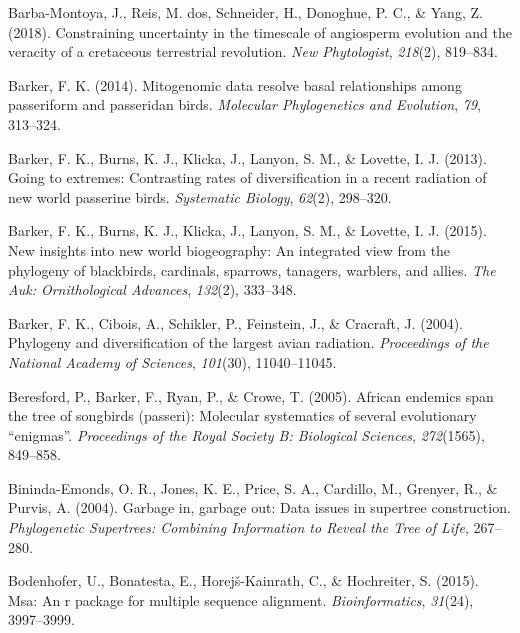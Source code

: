 \documentclass[english,man]{apa6}
\begin{document}
\leavevmode\hypertarget{ref-barba2018constraining}{}%
Barba-Montoya, J., Reis, M. dos, Schneider, H., Donoghue, P. C., \& Yang, Z. (2018). Constraining uncertainty in the timescale of angiosperm evolution and the veracity of a cretaceous terrestrial revolution. \emph{New Phytologist}, \emph{218}(2), 819--834.

\leavevmode\hypertarget{ref-barker2014mitogenomic}{}%
Barker, F. K. (2014). Mitogenomic data resolve basal relationships among passeriform and passeridan birds. \emph{Molecular Phylogenetics and Evolution}, \emph{79}, 313--324.

\leavevmode\hypertarget{ref-barker2013going}{}%
Barker, F. K., Burns, K. J., Klicka, J., Lanyon, S. M., \& Lovette, I. J. (2013). Going to extremes: Contrasting rates of diversification in a recent radiation of new world passerine birds. \emph{Systematic Biology}, \emph{62}(2), 298--320.

\leavevmode\hypertarget{ref-barker2015new}{}%
Barker, F. K., Burns, K. J., Klicka, J., Lanyon, S. M., \& Lovette, I. J. (2015). New insights into new world biogeography: An integrated view from the phylogeny of blackbirds, cardinals, sparrows, tanagers, warblers, and allies. \emph{The Auk: Ornithological Advances}, \emph{132}(2), 333--348.

\leavevmode\hypertarget{ref-barker2004phylogeny}{}%
Barker, F. K., Cibois, A., Schikler, P., Feinstein, J., \& Cracraft, J. (2004). Phylogeny and diversification of the largest avian radiation. \emph{Proceedings of the National Academy of Sciences}, \emph{101}(30), 11040--11045.

\leavevmode\hypertarget{ref-beresford2005african}{}%
Beresford, P., Barker, F., Ryan, P., \& Crowe, T. (2005). African endemics span the tree of songbirds (passeri): Molecular systematics of several evolutionary ``enigmas''. \emph{Proceedings of the Royal Society B: Biological Sciences}, \emph{272}(1565), 849--858.

\leavevmode\hypertarget{ref-bininda2004garbage}{}%
Bininda-Emonds, O. R., Jones, K. E., Price, S. A., Cardillo, M., Grenyer, R., \& Purvis, A. (2004). Garbage in, garbage out: Data issues in supertree construction. \emph{Phylogenetic Supertrees: Combining Information to Reveal the Tree of Life}, 267--280.

\leavevmode\hypertarget{ref-bodenhofer2015msa}{}%
Bodenhofer, U., Bonatesta, E., Horejš-Kainrath, C., \& Hochreiter, S. (2015). Msa: An r package for multiple sequence alignment. \emph{Bioinformatics}, \emph{31}(24), 3997--3999.
\end{document}

